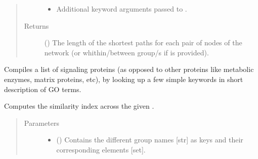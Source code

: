 \documentclass[letterpaper,10pt,english]{sphinxmanual}
\begin{document}
\begin{fulllineitems}
\begin{fulllineitems}
\begin{quote}
\begin{description}
\begin{itemize}
\item {} 
 \textendash{} Additional keyword arguments passed to
.

\end{itemize}

\item[{Returns}] \leavevmode
() \textendash{} The length of the shortest paths for each pair
of nodes of the network (or whithin/between group/s if
 is provided).

\end{description}\end{quote}

\end{fulllineitems}


\begin{fulllineitems}
\label{\detokenize{reference:pypath.main.PyPath.signaling_proteins_list}}
Compiles a list of signaling proteins (as opposed to other
proteins like metabolic enzymes, matrix proteins, etc), by
looking up a few simple keywords in short description of GO
terms.

\end{fulllineitems}


\begin{fulllineitems}
\label{\detokenize{reference:pypath.main.PyPath.signor_pathways}}
\end{fulllineitems}


\begin{fulllineitems}
\label{\detokenize{reference:pypath.main.PyPath.similarity_groups}}
Computes the similarity index across the given .
\begin{quote}\begin{description}
\item[{Parameters}] \leavevmode\begin{itemize}
\item {} 
 () \textendash{} Contains the different group names {[}str{]} as keys and their
corresponding elements {[}set{]}.


\end{itemize}
\end{description}
\end{quote}
\end{fulllineitems}
\end{fulllineitems}
\end{document}
